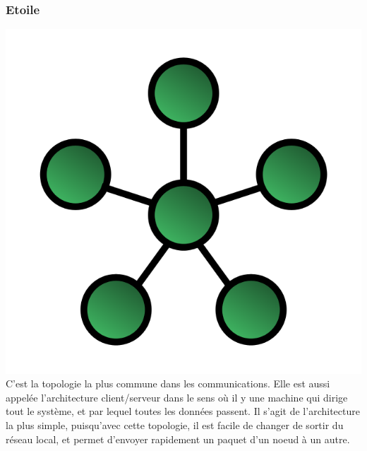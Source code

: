 	    \subsubsection{Etoile}
\includegraphics{img/StarNetwork.svg.png}
C'est la topologie la plus commune dans les communications. Elle est aussi appelée l'architecture 
client/serveur dans le sens où il y une machine qui dirige tout le système, et par lequel toutes les données 
passent. Il s'agit de l'architecture la plus simple, puisqu'avec cette topologie, il est facile de changer de 
sortir du réseau local, et permet d'envoyer rapidement un paquet d'un noeud à un autre.

